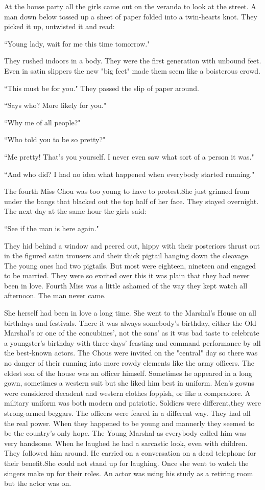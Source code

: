 \par At the house party all the girls came out on the veranda to look at the street. A man down below tossed up a sheet of paper folded into a twin-hearts knot. They picked it up, untwisted it and read:
\par ``Young lady, wait for me this time tomorrow."
\par They rushed indoors in a body. They were the first generation with unbound feet. Even in satin slippers the new "big feet" made them seem like a boisterous crowd.
\par ``This must be for you." They passed the slip of paper around.
\par ``Says who? More likely for you."
\par ``Why me of all people?"
\par ``Who told you to be so pretty?"
\par ``Me pretty! That's you yourself. I never even saw what sort of a person it was."
\par ``And who did? I had no idea what happened when everybody started running."
\par The fourth Miss Chou was too young to have to protest.She just grinned from under the bangs that blacked out the top half of her face. They stayed overnight. The next day at the same hour the girls said:
\par ``See if the man is here again."
\par They hid behind a window and peered out, hippy with their posteriors thrust out in the figured satin trousers and their thick pigtail hanging down the cleavage. The young ones had two pigtails. But most were eighteen, nineteen and engaged to be married. They were so excited over this it was plain that they had never been in love. Fourth Miss was a little ashamed of the way they kept watch all afternoon. The man never came.
\par She herself had been in love a long time. She went to the Marshal's House on all birthdays and festivals. There it was always somebody's birthday, either the Old Marshal's or one of the concubines', not the sons' as it was bad taste to celebrate a youngster's birthday with three days' feasting and command performance by all the best-known actors. The Chous were invited on the "central" day so there was no danger of their running into more rowdy elements like the army officers. The eldest son of the house was an officer himself. Sometimes he appeared in a long gown, sometimes a western suit but she liked him best in uniform. Men's gowns were considered decadent and western clothes foppish, or like a compradore. A military uniform was both modern and patriotic. Soldiers were different,they were strong-armed beggars. The officers were feared in a different way. They had all the real power. When they happened to be young and mannerly they seemed to be the country's only hope. The Young Marshal as everybody called him was very handsome. When he laughed he had a sarcastic look, even with children. They followed him around. He carried on a conversation on a dead telephone for their benefit.She could not stand up for laughing. Once she went to watch the singers make up for their roles. An actor was using his study as a retiring room but the actor was on.

